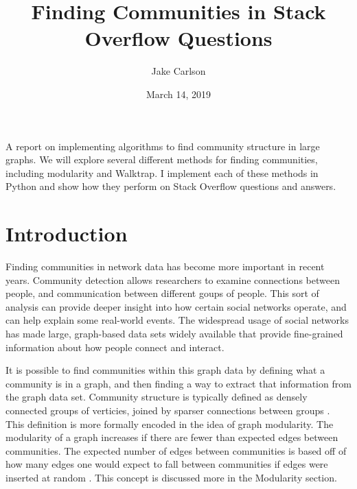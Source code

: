\documentclass{article}
\begin{document}
\title{Finding Communities in Stack Overflow Questions}
\author{Jake Carlson}
\date{March 14, 2019}
\maketitle

\abstract
A report on implementing algorithms to find community structure in large graphs. We will explore several different methods for finding communities, including modularity and Walktrap. I implement each of these methods in Python and show how they perform on Stack Overflow questions and answers.
\newpage

\tableofcontents
\newpage

\section{Introduction}
Finding communities in network data has become more important in recent years. Community detection allows researchers to examine connections between people, and communication between different goups of people. This sort of analysis can provide deeper insight into how certain social networks operate, and can help explain some real-world events. The widespread usage of social networks has made large, graph-based data sets widely available that provide fine-grained information about how people connect and interact.
\par
It is possible to find communities within this graph data by defining what a community is in a graph, and then finding a way to extract that information from the graph data set. Community structure is typically defined as densely connected groups of verticies, joined by sparser connections between groups \cite{Newman2004}. This definition is more formally encoded in the idea of graph modularity. The modularity of a graph increases if there are fewer than expected edges between communities. The expected number of edges between communities is based off of how many edges one would expect to fall between communities if edges were inserted at random \cite{Newman2006}. This concept is discussed more in the Modularity section.
\end{document}
